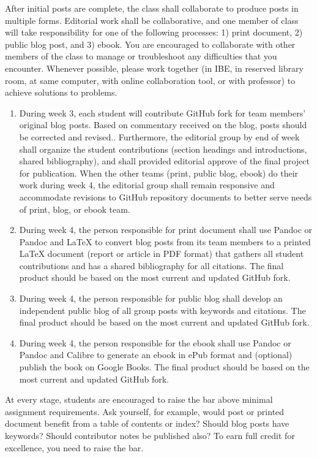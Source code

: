\documentclass[]{article}
\begin{document}
After initial posts are complete, the class shall collaborate to produce
posts in multiple forms. Editorial work shall be collaborative, and one
member of class will take responsibility for one of the following
processes: 1) print document, 2) public blog post, and 3) ebook. You are
encouraged to collaborate with other members of the class to manage or
troubleshoot any difficulties that you encounter. Whenever possible,
please work together (in IBE, in reserved library room, at same
computer, with online collaboration tool, or with professor) to achieve
solutions to problems.

\begin{enumerate}
\def\labelenumi{\arabic{enumi}.}
\itemsep1pt\parskip0pt
\item
  During week 3, each student will contribute GitHub fork for team
  members' original blog posts. Based on commentary received on the
  blog, posts should be corrected and revised.. Furthermore, the
  editorial group by end of week shall organize the student
  contributions (section headings and introductions, shared
  bibliography), and shall provided editorial approve of the final
  project for publication. When the other teams (print, public blog,
  ebook) do their work during week 4, the editorial group shall remain
  responsive and accommodate revisions to GitHub repository documents to
  better serve needs of print, blog, or ebook team.
\item
  During week 4, the person responsible for print document shall use
  Pandoc or Pandoc and LaTeX to convert blog posts from its team members
  to a printed LaTeX document (report or article in PDF format) that
  gathers all student contributions and has a shared bibliography for
  all citations. The final product should be based on the most current
  and updated GitHub fork.
\item
  During week 4, the person responsible for public blog shall develop an
  independent public blog of all group posts with keywords and
  citations. The final product should be based on the most current and
  updated GitHub fork.
\item
  During week 4, the person responsible for the ebook shall use Pandoc
  or Pandoc and Calibre to generate an ebook in ePub format and
  (optional) publish the book on Google Books. The final product should
  be based on the most current and updated GitHub fork.
\end{enumerate}

At every stage, students are encouraged to raise the bar above minimal
assignment requirements. Ask yourself, for example, would post or
printed document benefit from a table of contents or index? Should blog
posts have keywords? Should contributor notes be published also? To earn
full credit for excellence, you need to raise the bar.
\end{document}
